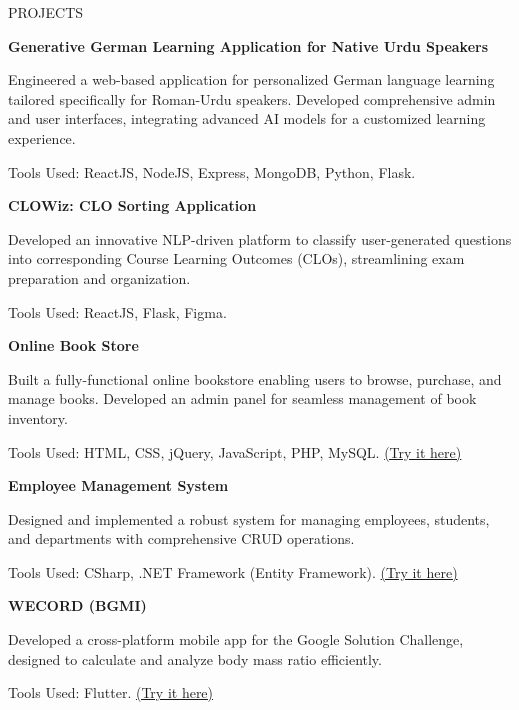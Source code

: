 \documentclass{resume}
\begin{document}
\begin{rSection}{PROJECTS}
\vspace{-1.25em}

\item \textbf{Generative German Learning Application for Native Urdu Speakers} \itemsep -3pt {}
     \item {Engineered a web-based application for personalized German language learning tailored specifically for Roman-Urdu speakers. Developed comprehensive admin and user interfaces, integrating advanced AI models for a customized learning experience.}
     \item Tools Used: ReactJS, NodeJS, Express, MongoDB, Python, Flask.

\item \textbf{CLOWiz: CLO Sorting Application} \itemsep -3pt {}
     \item {Developed an innovative NLP-driven platform to classify user-generated questions into corresponding Course Learning Outcomes (CLOs), streamlining exam preparation and organization.}
     \item Tools Used: ReactJS, Flask, Figma.

\item \textbf{Online Book Store} \itemsep -3pt {} 
     \item {Built a fully-functional online bookstore enabling users to browse, purchase, and manage books. Developed an admin panel for seamless management of book inventory.}
     \item Tools Used: HTML, CSS, jQuery, JavaScript, PHP, MySQL.
     \href{https://github.com/GurusGeek/Online-Book-Store}{(Try it here)}

\item \textbf{Employee Management System} \itemsep -3pt {} 
     \item {Designed and implemented a robust system for managing employees, students, and departments with comprehensive CRUD operations.}
     \item Tools Used: CSharp, .NET Framework (Entity Framework).
     \href{https://github.com/GurusGeek/Student-Department-employee-Managment-System}{(Try it here)}

\item \textbf{WECORD (BGMI)} \itemsep -3pt {} 
     \item {Developed a cross-platform mobile app for the Google Solution Challenge, designed to calculate and analyze body mass ratio efficiently.}
     \item Tools Used: Flutter.
     \href{https://github.com/GurusGeek/project}{(Try it here)}


\end{rSection}
\end{document}
